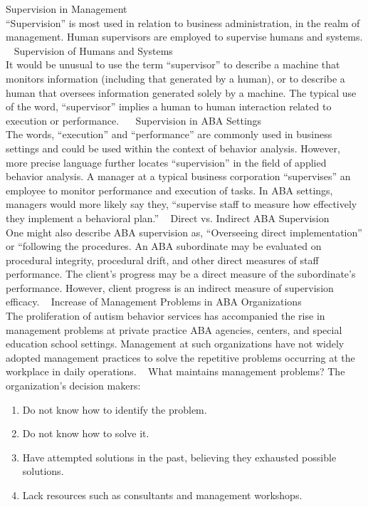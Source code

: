 Supervision in Management\\
``Supervision'' is most used in relation to business administration, in the realm of management. Human supervisors are employed to supervise humans and systems. 
 
Supervision of Humans and Systems\\
It would be unusual to use the term ``supervisor'' to describe a machine that monitors information (including that generated by a human), or to describe a human that oversees information generated solely by a machine. The typical use of the word, ``supervisor'' implies a human to human interaction related to execution or performance. 
  
Supervision in ABA Settings\\
The words, ``execution'' and ``performance'' are commonly used in business settings and could be used within the context of behavior analysis. However, more precise language further locates ``supervision'' in the field of applied behavior analysis. A manager at a typical business corporation ``supervises'' an employee to monitor performance and execution of tasks. In ABA settings, managers would more likely say they, ``supervise staff to measure how effectively they implement a behavioral plan.'' 
 
Direct vs. Indirect ABA Supervision\\
One might also describe ABA supervision as, ``Overseeing direct implementation'' or ``following the procedures. An ABA subordinate may be evaluated on procedural integrity, procedural drift, and other direct measures of staff performance. The client's progress may be a direct measure of the subordinate's performance. However, client progress is an indirect measure of supervision efficacy. 
 
Increase of Management Problems in ABA Organizations\\
The proliferation of autism behavior services has accompanied the rise in management problems at private practice ABA agencies, centers, and special education school settings. Management at such organizations have not widely adopted management practices to solve the repetitive problems occurring at the workplace in daily operations. 
 
What maintains management problems? The organization's decision makers: 
\begin{enumerate}
\item Do not know how to identify the problem.
\item Do not know how to solve it.
\item Have attempted solutions in the past, believing they exhausted possible solutions.
\item Lack resources such as consultants and management workshops.
\end{enumerate}


